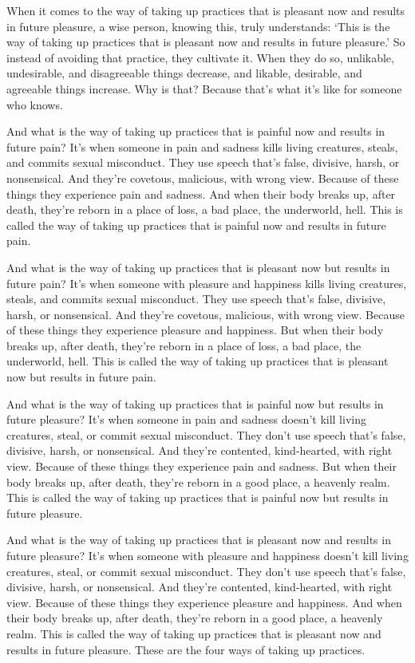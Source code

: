 \documentclass[12pt,openany]{book}%
\begin{document}
When it comes to the way of taking up practices that is pleasant now and results in future pleasure, a wise person, knowing this, truly understands: ‘This is the way of taking up practices that is pleasant now and results in future pleasure.’ So instead of avoiding that practice, they cultivate it. When they do so, unlikable, undesirable, and disagreeable things decrease, and likable, desirable, and agreeable things increase. Why is that? Because that’s what it’s like for someone who knows. 

And what is the way of taking up practices that is painful now and results in future pain? It’s when someone in pain and sadness kills living creatures, steals, and commits sexual misconduct. They use speech that’s false, divisive, harsh, or nonsensical. And they’re covetous, malicious, with wrong view. Because of these things they experience pain and sadness. And when their body breaks up, after death, they’re reborn in a place of loss, a bad place, the underworld, hell. This is called the way of taking up practices that is painful now and results in future pain. 

And what is the way of taking up practices that is pleasant now but results in future pain? It’s when someone with pleasure and happiness kills living creatures, steals, and commits sexual misconduct. They use speech that’s false, divisive, harsh, or nonsensical. And they’re covetous, malicious, with wrong view. Because of these things they experience pleasure and happiness. But when their body breaks up, after death, they’re reborn in a place of loss, a bad place, the underworld, hell. This is called the way of taking up practices that is pleasant now but results in future pain. 

And what is the way of taking up practices that is painful now but results in future pleasure? It’s when someone in pain and sadness doesn’t kill living creatures, steal, or commit sexual misconduct. They don’t use speech that’s false, divisive, harsh, or nonsensical. And they’re contented, kind-hearted, with right view. Because of these things they experience pain and sadness. But when their body breaks up, after death, they’re reborn in a good place, a heavenly realm. This is called the way of taking up practices that is painful now but results in future pleasure. 

And what is the way of taking up practices that is pleasant now and results in future pleasure? It’s when someone with pleasure and happiness doesn’t kill living creatures, steal, or commit sexual misconduct. They don’t use speech that’s false, divisive, harsh, or nonsensical. And they’re contented, kind-hearted, with right view. Because of these things they experience pleasure and happiness. And when their body breaks up, after death, they’re reborn in a good place, a heavenly realm. This is called the way of taking up practices that is pleasant now and results in future pleasure. These are the four ways of taking up practices. 
\end{document}
